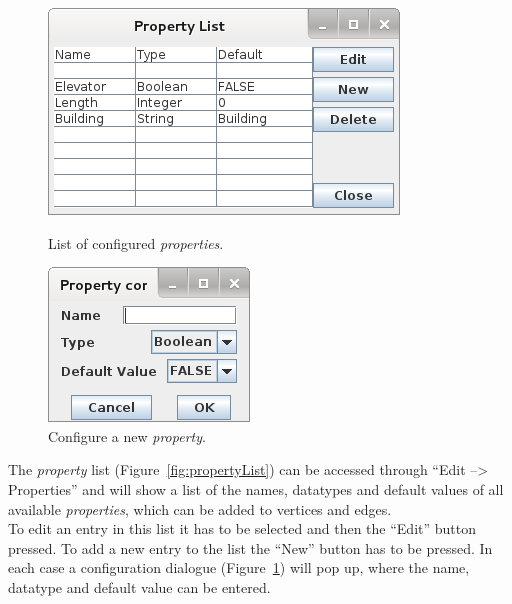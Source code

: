 \begin{figure}[h!]
\begin{minipage}[hbt]{8cm}
	\centering
	\includegraphics[scale=0.5]{gui-pictures/PropertyList.png}
	\caption{List of configured \textit{properties}.}
        \label{fig:propertyList}
\end{minipage}
\hfill
\begin{minipage}[hbt]{8cm}
	\centering
	\includegraphics[scale=0.5]{gui-pictures/PropertyConfig.png}
	\caption{Configure a new \textit{property}.}
        \label{fig:propertyConfig}
\end{minipage}
\end{figure}

The \textit{property} list (Figure~\ref{fig:propertyList}) can be accessed through ``Edit --> Properties'' and will show a list of the names, datatypes and default values of
all available \textit{properties}, which can be added to vertices and edges. \\
To edit an entry in this list it has to be selected and then the ``Edit'' button pressed.
To add a new entry to the list the ``New'' button has to be pressed.
In each case a configuration dialogue (Figure~\ref{fig:propertyConfig}) will pop up, where the name, datatype and
default value can be entered.

